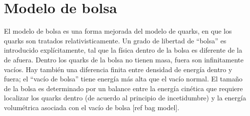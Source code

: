 %
%
%
%


\section{Modelo de bolsa}

El modelo de bolsa es una forma mejorada del modelo de quarks, en que los quarks son tratados relativisticamente. Un grado de libertad de ``bolsa'' es introducido explícitamente, tal que la física dentro de la bolsa es diferente de la de afuera. Dentro los quarks de la bolsa no tienen masa, fuera son infinitamente vacíos. Hay también una diferencia finita entre densidad de energía dentro y fuera; el ``vacío de bolsa'' tiene energía más alta que el vacío normal. El tamaño de la bolsa es determinado por un balance entre la energía cinética que requiere localizar los quarks dentro (de acuerdo al principio de incetidumbre) y la energía volumétrica asociada con el vacío de bolsa [ref bag model].

